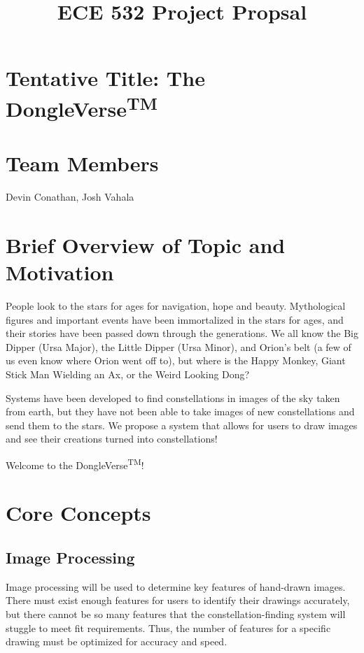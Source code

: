 \documentclass{article}
\title{ECE 532 Project Propsal}
\date{}
\author{}
\makeatletter
\let\saved@bibitem\@bibitem
\makeatother
\begin{document}
\begingroup
  \makeatletter
  \let\@bibitem\saved@bibitem
  
\endgroup

\maketitle

\section{Tentative Title: The DongleVerse\textsuperscript{TM\textregistered}}
\section{Team Members}
Devin Conathan, Josh Vahala

\section{Brief Overview of Topic and Motivation}
People look to the stars for ages for navigation, hope and beauty. Mythological figures and important events have been immortalized in the stars for ages, and their stories have been passed down through the generations. We all know the Big Dipper (Ursa Major), the Little Dipper (Ursa Minor), and Orion's belt (a few of us even know where Orion went off to), but where is the Happy Monkey, Giant Stick Man Wielding an Ax, or the Weird Looking Dong?

Systems have been developed to find constellations in images of the sky taken from earth, but they have not been able to take images of new constellations and send them to the stars. We propose a system that allows for users to draw images and see their creations turned into constellations!

Welcome to the DongleVerse\textsuperscript{TM\textregistered}! 

\section{Core Concepts}

\subsection{Image Processing}
Image processing will be used to determine key features of hand-drawn images. There must exist enough features for users to identify their drawings accurately, but there cannot be so many features that the constellation-finding system will stuggle to meet fit requirements. Thus, the number of features for a specific drawing must be optimized for accuracy and speed.
\end{document}
